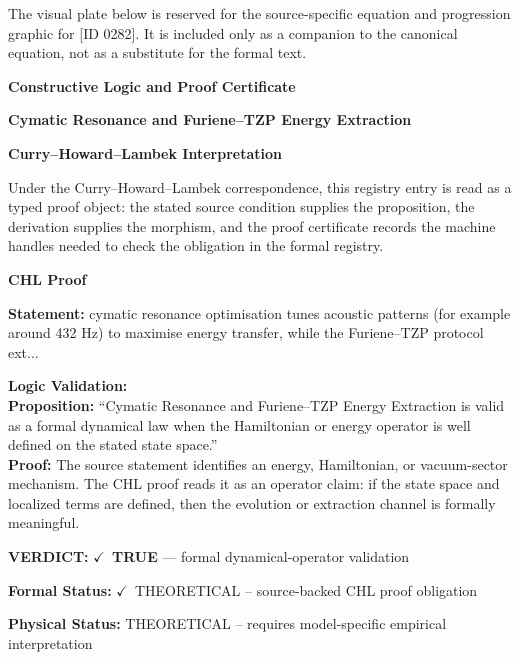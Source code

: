 \begingroup\footnotesize\sloppy
The visual plate below is reserved for the source-specific equation and progression graphic for [ID 0282]. It is included only as a companion to the canonical equation, not as a substitute for the formal text.
\par\endgroup
\ifTZPDarkEdition
{}
\fi

\clearpage
\begingroup\tzpsupportsetup
\noindent\textbf{\fontsize{10.8pt}{12.8pt}\selectfont [ID 0282] Constructive Logic and Proof Certificate}\par
\noindent\textbf{\fontsize{10pt}{12pt}\selectfont Cymatic Resonance and Furiene--TZP Energy Extraction}\par
\vspace{0.45em}
\begingroup
\footnotesize
\setlength{\parskip}{0.22em}
\setlength{\parindent}{0pt}
\noindent\textbf{Curry--Howard--Lambek Interpretation}\par
Under the Curry--Howard--Lambek correspondence, this registry entry is read as a typed proof
object: the stated source condition supplies the proposition, the derivation supplies the
morphism, and the proof certificate records the machine handles needed to check the obligation
in the formal registry.

\vspace{0.45em}
\noindent\textbf{CHL Proof}\par
\textbf{Statement:} cymatic resonance optimisation tunes acoustic patterns (for example around 432 Hz) to
maximise energy transfer, while the Furiene--TZP protocol ext...

\textbf{Logic Validation:}\\
\textbf{Proposition:} ``Cymatic Resonance and Furiene--TZP Energy Extraction is valid as a formal dynamical law
when the Hamiltonian or energy operator is well defined on the stated state space.''\\
\textbf{Proof:} The source statement identifies an energy, Hamiltonian, or vacuum-sector mechanism. The
CHL proof reads it as an operator claim: if the state space and localized terms are
defined, then the evolution or extraction channel is formally meaningful.

\textbf{VERDICT:} \ensuremath{\checkmark}\ \textbf{TRUE} --- formal dynamical-operator validation

\textbf{Formal Status:} \ensuremath{\checkmark}\ THEORETICAL -- source-backed CHL proof obligation

\textbf{Physical Status:} THEORETICAL -- requires model-specific empirical interpretation
\par\vspace{0.45em}
\par
\ifTZPDarkEdition
{}
\fi
\endgroup
\endgroup
